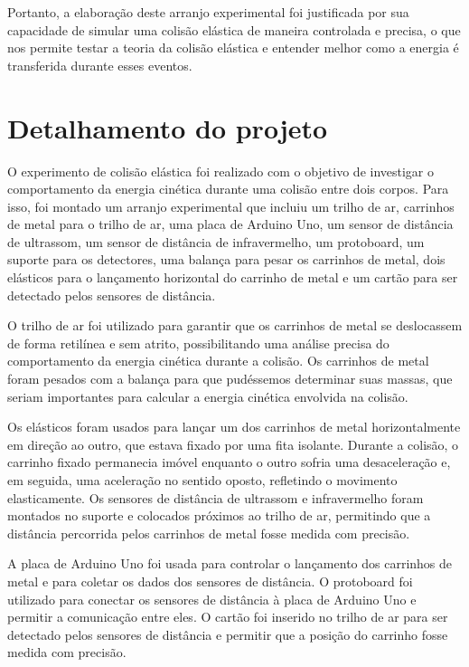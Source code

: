 \documentclass[a4paper,12pt]{article}
\begin{document}
\begin{multicols}{2}
Portanto, a elaboração deste arranjo experimental foi justificada por sua capacidade de simular uma colisão elástica de maneira controlada e precisa, o que nos permite testar a teoria da colisão elástica e entender melhor como a energia é transferida durante esses eventos.

\section{Detalhamento do projeto}

O experimento de colisão elástica foi realizado com o objetivo de investigar o comportamento da energia cinética durante uma colisão entre dois corpos. Para isso, foi montado um arranjo experimental que incluiu um trilho de ar, carrinhos de metal para o trilho de ar, uma placa de Arduino Uno, um sensor de distância de ultrassom, um sensor de distância de infravermelho, um protoboard, um suporte para os detectores, uma balança para pesar os carrinhos de metal, dois elásticos para o lançamento horizontal do carrinho de metal e um cartão para ser detectado pelos sensores de distância.

O trilho de ar foi utilizado para garantir que os carrinhos de metal se deslocassem de forma retilínea e sem atrito, possibilitando uma análise precisa do comportamento da energia cinética durante a colisão. Os carrinhos de metal foram pesados com a balança para que pudéssemos determinar suas massas, que seriam importantes para calcular a energia cinética envolvida na colisão.

Os elásticos foram usados para lançar um dos carrinhos de metal horizontalmente em direção ao outro, que estava fixado por uma fita isolante. Durante a colisão, o carrinho fixado permanecia imóvel enquanto o outro sofria uma desaceleração e, em seguida, uma aceleração no sentido oposto, refletindo o movimento elasticamente. Os sensores de distância de ultrassom e infravermelho foram montados no suporte e colocados próximos ao trilho de ar, permitindo que a distância percorrida pelos carrinhos de metal fosse medida com precisão.

A placa de Arduino Uno foi usada para controlar o lançamento dos carrinhos de metal e para coletar os dados dos sensores de distância. O protoboard foi utilizado para conectar os sensores de distância à placa de Arduino Uno e permitir a comunicação entre eles. O cartão foi inserido no trilho de ar para ser detectado pelos sensores de distância e permitir que a posição do carrinho fosse medida com precisão.


\end{multicols}
\end{document}

